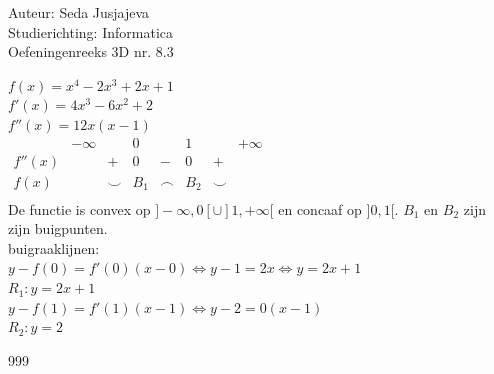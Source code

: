 \documentclass[a4paper]{article}
\begin{document}
\noindent \large Auteur: Seda Jusjajeva\\
\noindent \large Studierichting: Informatica\\
\noindent \large Oefeningenreeks 3D nr. 8.3 \\

\medskip

\normalsize


$f(x) = x^4 - 2x^3 +2x + 1$ \\

$f'(x) = 4x^3 - 6x^2 + 2$ \\

$f''(x) = 12x(x-1)$ \\

$\begin{array}{r|ccccccc}
           & -\infty &        & 0   &        & 1   &        & +\infty \\
    \hline  
    f''(x) &         & +      & 0   & -      & 0   & +      &         \\
    f(x)   &         & \smile & B_1 & \frown & B_2 & \smile &         \\
\end{array}$ \\

De functie is convex op $]-\infty,0[\cup]1,+\infty[$ en concaaf op $]0,1[$. $B_1$ en $B_2$ zijn zijn buigpunten. \\

buigraaklijnen: \\

$y - f(0) = f'(0)(x - 0) \Leftrightarrow y - 1 = 2x \Leftrightarrow y = 2x + 1$ \\

$R_1: y = 2x + 1$ \\

$y - f(1) = f'(1)(x - 1) \Leftrightarrow y - 2 = 0(x - 1)$ \\

$R_2: y = 2$ \\



\begin{thebibliography}{999}
\end{thebibliography}
\end{document}
